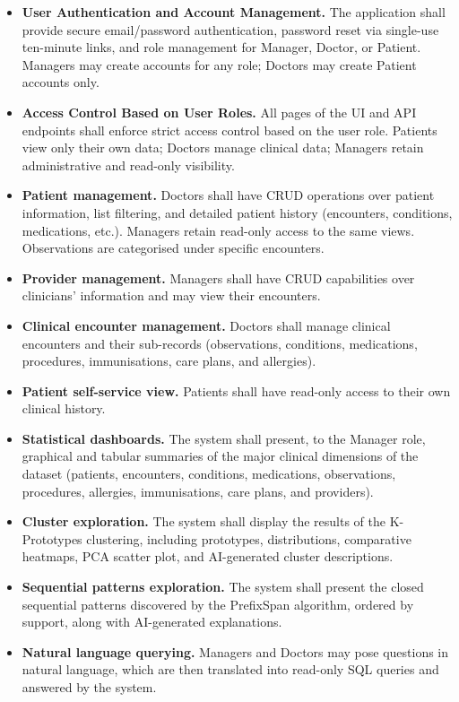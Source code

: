 \begin{itemize}
    \item \textbf{User Authentication and Account Management.} The application shall provide secure email/password authentication, password reset via single-use ten-minute links, and role management for Manager, Doctor, or Patient. Managers may create accounts for any role; Doctors may create Patient accounts only.

    \item \textbf{Access Control Based on User Roles.} All pages of the UI and API endpoints shall enforce strict access control based on the user role. Patients view only their own data; Doctors manage clinical data; Managers retain administrative and read-only visibility.

    \item \textbf{Patient management.} Doctors shall have CRUD operations over patient information, list filtering, and detailed patient history (encounters, conditions, medications, etc.). Managers retain read-only access to the same views. Observations are categorised under specific encounters.

    \item \textbf{Provider management.} Managers shall have CRUD capabilities over clinicians' information and may view their encounters.

    \item \textbf{Clinical encounter management.} Doctors shall manage clinical encounters and their sub-records (observations, conditions, medications, procedures, immunisations, care plans, and allergies).

    \item \textbf{Patient self-service view.} Patients shall have read-only access to their own clinical history.

    \item \textbf{Statistical dashboards.} The system shall present, to the Manager role, graphical and tabular summaries of the major clinical dimensions of the dataset (patients, encounters, conditions, medications, observations, procedures, allergies, immunisations, care plans, and providers).

    \item \textbf{Cluster exploration.} The system shall display the results of the K-Prototypes clustering, including prototypes, distributions, comparative heatmaps, PCA scatter plot, and AI-generated cluster descriptions.

    \item \textbf{Sequential patterns exploration.} The system shall present the closed sequential patterns discovered by the PrefixSpan algorithm, ordered by support, along with AI-generated explanations.

    \item \textbf{Natural language querying.} Managers and Doctors may pose questions in natural language, which are then translated into read-only SQL queries and answered by the system.
\end{itemize}

